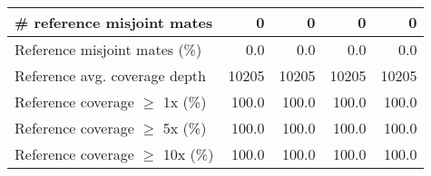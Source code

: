 \documentclass[12pt,a4paper]{article}
\begin{document}
\begin{table}[ht]
\begin{center}
\begin{tabular}{|l*{4}{|r}|}
\# reference misjoint mates & 0 & 0 & 0 & 0 \\ \hline
Reference misjoint mates (\%) & 0.0 & 0.0 & 0.0 & 0.0 \\ \hline
Reference avg. coverage depth & 10205 & 10205 & 10205 & 10205 \\ \hline
Reference coverage $\geq$ 1x (\%) & 100.0 & 100.0 & 100.0 & 100.0 \\ \hline
Reference coverage $\geq$ 5x (\%) & 100.0 & 100.0 & 100.0 & 100.0 \\ \hline
Reference coverage $\geq$ 10x (\%) & 100.0 & 100.0 & 100.0 & 100.0 \\ \hline
\end{tabular}
\end{center}
\end{table}
\end{document}
